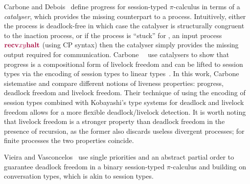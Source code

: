 Carbone and Debois~\cite{carbonedebois10} define progress for session-typed $\pi$-calculus in terms of a \emph{catalyser}, which provides the missing counterpart to a process. Intuitively,  either the process is deadlock-free in which case the catalyser is structurally congruent to the inaction process, or if the process is ``stuck'' for \eg, an input process $\tm{\recv{x}{y}{\halt}}$ (using CP syntax) then the catalyser simply provides the missing output required for communication. Carbone~\etal~\cite{carbonedardha14} use catalysers to show that progress is a compositional form of livelock freedom and can be lifted to session types via the encoding of session types to linear types~\cite{kobayashi07,dardhagiachino12,dardha14beat,dardhaetal17}. In this work, Carbone \etal \cite{carbonedardha14} sistematise and compare different notions of liveness properties: progress, deadlock freedom and livelock freedom. Their technique of using the encoding of session types combined with Kobayashi's type systems for deadlock and livelock freedom allows for a more flexible deadlock/livelock detection. It is worth noting that livelock freedom is a stronger property than deadlock freedom in the presence of recursion, as the former also discards useless divergent processes; for finite processes the two properties coincide.

Vieira and Vasconcelos~\cite{vieiravasconcelos13} use single priorities and an abstract partial order to guarantee deadlock freedom in a binary session-typed $\pi$-calculus and building on conversation types, which is akin to session types.

